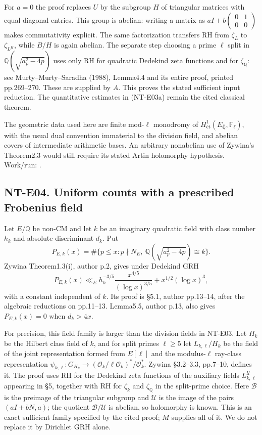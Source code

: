 \documentclass[11pt,a4paper]{article}
\begin{document}
For $a=0$ the proof replaces $U$ by the subgroup $H$ of triangular
matrices with equal diagonal entries. This group is abelian:
writing a matrix as $aI+b\left(\begin{smallmatrix}0&1\\0&0\end{smallmatrix}\right)$
makes commutativity explicit. The same factorization transfers RH
from $\zeta_L$ to $\zeta_{L^H}$, while $B/H$ is again abelian.
The separate step choosing a prime $\ell$ split in
$\mathbb Q(\sqrt{a_p^2-4p})$ uses only RH for quadratic Dedekind
zeta functions and for $\zeta_{\mathbb Q}$: see Murty--Murty--Saradha
(1988), Lemma4.4 and its entire proof, printed pp.269--270.
These are supplied by $A$. This proves the stated sufficient input
reduction. The quantitative estimates in (NT-E03a) remain the
cited classical theorem.

The geometric data used here are finite mod-$\ell$ monodromy of
$H^1_{\text{ét}}(E_{\overline{\mathbb Q}},\mathbb F_\ell)$, with
the usual dual convention immaterial to the division field, and
abelian covers of intermediate arithmetic bases. An arbitrary
nonabelian use of Zywina's Theorem2.3 would still require its stated
Artin holomorphy hypothesis. Work/run:
.

\subsection*{NT-E04. Uniform counts with a prescribed Frobenius field}
Let $E/\mathbb Q$ be non-CM and let $k$ be an imaginary quadratic
field with class number $h_k$ and absolute discriminant $d_k$.
Put
\[
 P_{E,k}(x)=\#\{p\le x:p\nmid N_E,\
            \mathbb Q(\sqrt{a_p^2-4p})\cong k\}.
\]
Zywina Theorem1.3(i), author p.2, gives under Dedekind GRH
\[
 P_{E,k}(x)\ll_E
   h_k^{-3/5}\frac{x^{4/5}}{(\log x)^{3/5}}
                   +x^{1/2}(\log x)^3,                    \tag{NT-E04a}
\]
with a constant independent of $k$. Its proof is \S5.1,
author pp.13--14, after the algebraic reductions on pp.11--13.
Lemma5.5, author p.13, also gives $P_{E,k}(x)=0$ when $d_k>4x$.

For precision, this field family is larger than the division
fields in NT-E03. Let $H_k$ be the Hilbert class field of $k$,
and for split primes $\ell\ge5$ let $L_{k,\ell}/H_k$ be the
field of the joint representation formed from $E[\ell]$ and
the modulus-$\ell$ ray-class representation
$\psi_{k,\ell}:G_{H_k}\to
(\mathcal O_k/\ell\mathcal O_k)^*/\mathcal O_k^*$.
Zywina \S3.2--3.3, pp.7--10, defines it. The proof uses RH for
the Dedekind zeta functions of the auxiliary fields
$L_{k,\ell}^{\mathcal U}$ appearing in \S5, together with RH
for $\zeta_k$ and $\zeta_{\mathbb Q}$ in the split-prime choice.
Here $\mathcal B$ is the preimage of the triangular subgroup and
$\mathcal U$ is the image of the pairs $(aI+bN,a)$; the quotient
$\mathcal B/\mathcal U$ is abelian, so holomorphy is known.
This is an exact sufficient family specified by the cited proof;
$M$ supplies all of it. We do not replace it by Dirichlet GRH alone.
\end{document}
